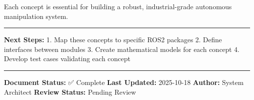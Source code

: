 \documentclass[
]{article}
\begin{document}
Each concept is essential for building a robust, industrial-grade
autonomous manipulation system.

\begin{center}\rule{0.5\linewidth}{0.5pt}\end{center}

\textbf{Next Steps:} 1. Map these concepts to specific ROS2 packages 2.
Define interfaces between modules 3. Create mathematical models for each
concept 4. Develop test cases validating each concept

\begin{center}\rule{0.5\linewidth}{0.5pt}\end{center}

\textbf{Document Status:} ✅ Complete \textbf{Last Updated:} 2025-10-18
\textbf{Author:} System Architect \textbf{Review Status:} Pending Review
\end{document}
